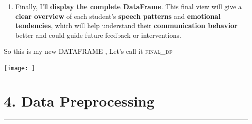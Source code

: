 \documentclass{article}
\newcommand{\highlight}[1]{\textsf{\textbf{#1}}}  %
\begin{document}
\begin{multicols}{2}
\begin{enumerate}
    \item Finally, I’ll \highlight{display the complete DataFrame}. This final view will give a \highlight{clear overview} of each student's \highlight{speech patterns} and \highlight{emotional tendencies}, which will help understand their \highlight{communication behavior} better and could guide future feedback or interventions.
\end{enumerate}

\end{multicols}
\newpage

So this is my new DATAFRAME , Let's call it \textsc{final\_df}
\begin{center}
    
\texttt{[image: ]}
\end{center}

\section{4. Data Preprocessing}
  \begin{center}
        \color{red}\rule{1\linewidth}{1mm}
    \end{center}
    
\end{document}
